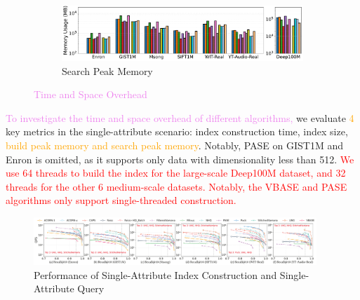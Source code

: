\documentclass[sigconf, nonacm]{acmart}
\begin{document}
{\begin{figure}[t]
		\begin{subfigure}{\columnwidth}
			\centering
			
			\includegraphics[width=0.99\linewidth]{figures/searchMem/label_memory_comparison.pdf}
			\caption{Search Peak Memory}
			\label{fig:search_memory_mb_comparison}
		\end{subfigure}
		
		\caption{\textcolor{violet}{Time and Space Overhead}}
		\label{fig:build_index_comparison}
	\end{figure}
	
	
	
	\textcolor{violet}{To investigate the time and space overhead of different algorithms,} we evaluate \textcolor{orange}{4} key metrics in the single-attribute scenario: index construction time, index size, \textcolor{orange}{build peak memory and search peak memory}. Notably, PASE on GIST1M and Enron is omitted, as it supports only data with dimensionality less than 512. \textcolor{red}{We use 64 threads to build the index for the large-scale Deep100M dataset, and 32 threads for the other 6 medium-scale datasets. Notably, the VBASE and PASE algorithms only support single-threaded construction.}
	
	
	\begin{figure}
		\centering
		
		\includegraphics[width=0.95\textwidth]{figures/exp/exp_1_1_SingleLabel_1thread.pdf}
		\caption{Performance of Single-Attribute Index Construction and Single-Attribute Query }
		\label{fig:exp_1_1_SingleLabel_1thread}
	\end{figure}
	
%		
	
}
\end{document}
